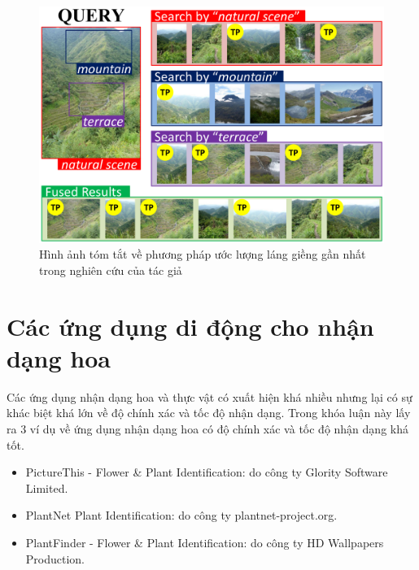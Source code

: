 \documentclass[12pt]{report}
\begin{document}
		\begin{figure}[h]
			\centering
			\includegraphics[scale=0.3]{one}
			\caption{Hình ảnh tóm tắt về phương pháp ước lượng láng giềng gần nhất trong nghiên cứu \cite{cia-ONE} của tác giả}
			\label{fig:one}
		\end{figure}		\newpage
																						
		\section{Các ứng dụng di động cho nhận dạng hoa}
																				
		Các ứng dụng nhận dạng hoa và thực vật có xuất hiện khá nhiều nhưng lại có sự khác biệt khá lớn về độ chính xác và tốc độ nhận dạng. Trong khóa luận này lấy ra 3 ví dụ về ứng dụng nhận dạng hoa có độ chính xác và tốc độ nhận dạng khá tốt.
																				
																						
																				
		\begin{itemize}
			\item PictureThis - Flower \& Plant Identification: do công ty Glority Software Limited.	
			\item PlantNet Plant Identification: do công ty plantnet-project.org.
			\item PlantFinder - Flower \& Plant Identification: do công ty HD Wallpapers Production. 		
		\end{itemize}
																				
\end{document}
